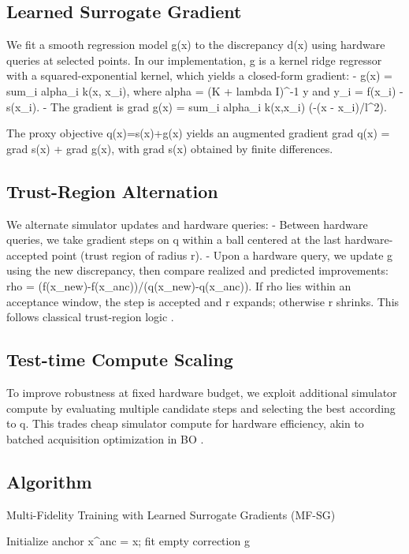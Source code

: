 \subsection{Learned Surrogate Gradient}
We fit a smooth regression model g(x) to the discrepancy d(x) using hardware queries at selected points. In our implementation, g is a kernel ridge regressor with a squared-exponential kernel, which yields a closed-form gradient:
- g(x) = sum_i alpha_i k(x, x_i), where alpha = (K + lambda I)^{-1} y and y_i = f(x_i) - s(x_i).
- The gradient is grad g(x) = sum_i alpha_i k(x,x_i) (-(x - x_i)/l^2).

The proxy objective q(x)=s(x)+g(x) yields an augmented gradient grad q(x) = grad s(x) + grad g(x), with grad s(x) obtained by finite differences.

\subsection{Trust-Region Alternation}
We alternate simulator updates and hardware queries:
- Between hardware queries, we take gradient steps on q within a ball centered at the last hardware-accepted point (trust region of radius r).
- Upon a hardware query, we update g using the new discrepancy, then compare realized and predicted improvements: rho = (f(x_{new})-f(x_{anc}))/(q(x_{new})-q(x_{anc})). If rho lies within an acceptance window, the step is accepted and r expands; otherwise r shrinks. This follows classical trust-region logic \citep{Conn2000}.

\subsection{Test-time Compute Scaling}
To improve robustness at fixed hardware budget, we exploit additional simulator compute by evaluating multiple candidate steps and selecting the best according to q. This trades cheap simulator compute for hardware efficiency, akin to batched acquisition optimization in BO \citep{Shahriari2016,Frazier2018}.

\subsection{Algorithm}
\begin{algorithm}[h]
\caption{Multi-Fidelity Training with Learned Surrogate Gradients (MF-SG)}
Initialize anchor x^{anc} = x; fit empty correction g\;
\end{algorithm}

